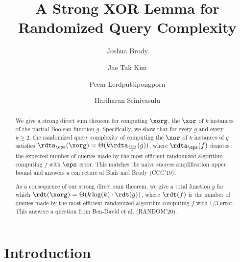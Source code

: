 \documentclass{toc}
\begin{document}
\begin{frontmatter}%

%
%
%

%
\title{A Strong XOR Lemma for Randomized Query Complexity}  %

%
%

%
%
%
%
%
%

%
%
%
%
%
%
%
%
%
%
%
%


%
%
%
%

%


\author[brody]{Joshua Brody}
\author[kim]{Jae Tak Kim}
\author[lerdputtipongporn]{Peem Lerdputtipongporn}
\author[srinivasulu]{Hariharan Srinivasulu}

%
%
%
%

%
%
%
%
%
%
%
%
\begin{abstract}
  We give a strong direct sum theorem for computing $\xorg$,
  the $\xor$ of $k$ instances of the partial Boolean function $g$.  %
  Specifically, we show that for every %
  $g$  %
  and every
  $k\geq 2$, the randomized query complexity of computing the $\xor$
  of $k$ instances of $g$ satisfies
  $\rdta_\eps(\xorg) = \Theta(k \rdta_{\frac{\eps}{k}}(g))$,
  where $\rdta_\eps(f)$ denotes the expected number of queries made by the most efficient randomized algorithm computing $f$ with $\eps$ error. %
  This matches the naive success amplification upper bound and answers a
  conjecture of %
  Blais and Brody (CCC'19).  %

  As a consequence of our strong direct sum theorem, we give a total
  function $g$ for which
  $\rdt(\xorg) = \Theta(k \log(k)\cdot \rdt(g))$, %
  where $\rdt(f)$ is the number of queries made by the most efficient randomized algorithm computing $f$ with $1/3$ error.  This answers a %
  question from %
  Ben-David et al. (RANDOM'20).  %
\end{abstract}

%

\end{frontmatter}

%
%
%
\section{Introduction}
\end{document}
